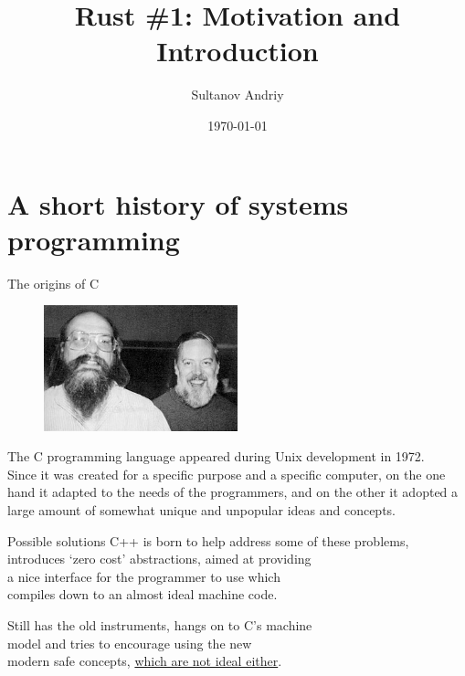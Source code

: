 \documentclass[usenames,dvipsnames,10pt,aspectratio=169]{beamer}
\title[Rust \#1]{Rust \#1: Motivation and Introduction}
\date[\today]{\small\today}
\author[Sultanov Andriy]{Sultanov Andriy}
\institute{APPS@UCU}
\begin{document}
\begin{frame}
\titlepage
\end{frame}

\begin{frame}{\contentsname}
\tableofcontents
\end{frame}


\section{A short history of systems programming}
\begin{frame}{The origins of C}

\begin{figure}
\centering
\includegraphics[width=0.5\textwidth]{graphics/ritchie.jpg}
\end{figure}
\normalsize
The C programming language appeared during Unix development in 1972.\\

Since it was created for a specific purpose %
and a specific computer, %
on the one hand it adapted to the
needs of the programmers, and on the 
other it adopted a large
amount of somewhat unique and unpopular 
ideas and concepts.

\vskip 0.8cm

\end{frame}

\begin{frame}{Possible solutions}
\large
C++ is born to help address some of these problems,\\ 
introduces ‘zero cost’ abstractions, aimed at providing\\
a nice interface for the programmer to use which\\
compiles down to an almost ideal machine code.
\vspace{0.5cm}

Still has the old instruments, hangs on to C's machine\\
model %
and tries to encourage using the new\\ 
modern safe concepts, 
\href{https://alexgaynor.net/2019/apr/21/modern-c++-wont-save-us/}
{which are not ideal either}.


\end{frame}
\end{document}
